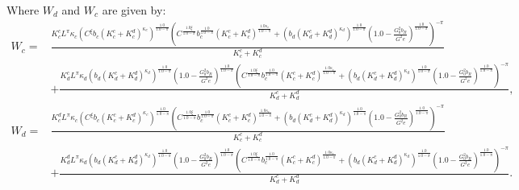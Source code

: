 Where $W_d$ and $W_c$ are given by:
\begin{align*}
%
  W_c =& \frac{K^{c}_{c} L^{\pi} \kappa_{c} \left(C^{\xi} b_{c} \left(K^{c}_{c} + K^{d}_{c}\right)^{\kappa_{c}}\right)^{\frac{1.0}{1.0 - \pi}} \left(C^{\frac{1.0 \xi}{1.0 - \pi}} b_{c}^{\frac{1.0}{1.0 - \pi}} \left(K^{c}_{c} + K^{d}_{c}\right)^{\frac{1.0 \kappa_{c}}{1.0 - \pi}} + \left(b_{d} \left(K^{c}_{d} + K^{d}_{d}\right)^{\kappa_{d}}\right)^{\frac{1.0}{1.0 - \pi}} \left(1.0 - \frac{G_{0}^{2} b_{R}}{G^{2} e}\right)^{\frac{1.0}{1.0 - \pi}}\right)^{- \pi}}{K^{c}_{c} + K^{d}_{c}} \\
  &+ \frac{K^{c}_{d} L^{\pi} \kappa_{d} \left(b_{d} \left(K^{c}_{d} + K^{d}_{d}\right)^{\kappa_{d}}\right)^{\frac{1.0}{1.0 - \pi}} \left(1.0 - \frac{G_{0}^{2} b_{R}}{G^{2} e}\right)^{\frac{1.0}{1.0 - \pi}} \left(C^{\frac{1.0 \xi}{1.0 - \pi}} b_{c}^{\frac{1.0}{1.0 - \pi}} \left(K^{c}_{c} + K^{d}_{c}\right)^{\frac{1.0 \kappa_{c}}{1.0 - \pi}} + \left(b_{d} \left(K^{c}_{d} + K^{d}_{d}\right)^{\kappa_{d}}\right)^{\frac{1.0}{1.0 - \pi}} \left(1.0 - \frac{G_{0}^{2} b_{R}}{G^{2} e}\right)^{\frac{1.0}{1.0 - \pi}}\right)^{- \pi}}{K^{c}_{d} + K^{d}_{d}}, \\
%
  W_d =& \frac{K^{d}_{c} L^{\pi} \kappa_{c} \left(C^{\xi} b_{c} \left(K^{c}_{c} + K^{d}_{c}\right)^{\kappa_{c}}\right)^{\frac{1.0}{1.0 - \pi}} \left(C^{\frac{1.0 \xi}{1.0 - \pi}} b_{c}^{\frac{1.0}{1.0 - \pi}} \left(K^{c}_{c} + K^{d}_{c}\right)^{\frac{1.0 \kappa_{c}}{1.0 - \pi}} + \left(b_{d} \left(K^{c}_{d} + K^{d}_{d}\right)^{\kappa_{d}}\right)^{\frac{1.0}{1.0 - \pi}} \left(1.0 - \frac{G_{0}^{2} b_{R}}{G^{2} e}\right)^{\frac{1.0}{1.0 - \pi}}\right)^{- \pi}}{K^{c}_{c} + K^{d}_{c}}\\
  &+ \frac{K^{d}_{d} L^{\pi} \kappa_{d} \left(b_{d} \left(K^{c}_{d} + K^{d}_{d}\right)^{\kappa_{d}}\right)^{\frac{1.0}{1.0 - \pi}} \left(1.0 - \frac{G_{0}^{2} b_{R}}{G^{2} e}\right)^{\frac{1.0}{1.0 - \pi}} \left(C^{\frac{1.0 \xi}{1.0 - \pi}} b_{c}^{\frac{1.0}{1.0 - \pi}} \left(K^{c}_{c} + K^{d}_{c}\right)^{\frac{1.0 \kappa_{c}}{1.0 - \pi}} + \left(b_{d} \left(K^{c}_{d} + K^{d}_{d}\right)^{\kappa_{d}}\right)^{\frac{1.0}{1.0 - \pi}} \left(1.0 - \frac{G_{0}^{2} b_{R}}{G^{2} e}\right)^{\frac{1.0}{1.0 - \pi}}\right)^{- \pi}}{K^{c}_{d} + K^{d}_{d}}.
\end{align*}

\recalctypearea
